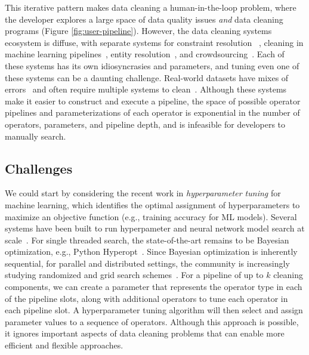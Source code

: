 This iterative pattern makes data cleaning a human-in-the-loop problem, where the developer explores a large space of data quality issues {\it and} data cleaning programs (Figure \ref{fig:user-pipeline}).  However, the data cleaning systems ecosystem is diffuse, with separate systems for constraint resolution ~\cite{rekatsinas2017holoclean}, cleaning in machine learning pipelines~\cite{DBLP:journals/pvldb/KrishnanWWFG16}, entity resolution~\cite{mudgal2018deep, doan2018toward}, and crowdsourcing~\cite{DBLP:journals/pvldb/HaasKWF015}.
Each of these systems has its own idiosyncrasies and parameters, and tuning even one of these systems can be a daunting challenge.
Real-world datasets have mixes of errors~\cite{krishnan2016hilda} and often require multiple systems to clean~\cite{DBLP:conf/sigmod/ChuIKW16}.
Although these systems make it easier to construct and execute a pipeline, the space of possible operator pipelines and parameterizations of each operator is exponential in the number of operators, parameters, and pipeline depth, and is infeasible for developers to manually search.

\subsection{Challenges}
We could start by considering the recent work in \emph{hyperparameter tuning} for machine learning, which identifies the optimal assignment of hyperparameters to maximize an objective function (e.g., training accuracy for ML models).
Several systems have been built to run hyperpameter and neural network model search at scale~\cite{li2017hyperband, sparks2017keystoneml, baylor2017tfx, golovin2017google, liaw2018tune}.
For single threaded search, the state-of-the-art remains to be Bayesian optimization, e.g., Python Hyperopt~\cite{bergstra2013hyperopt}.
Since Bayesian optimization is inherently sequential, for parallel and distributed settings, the community is increasingly studying randomized and grid search schemes~\cite{li2017hyperband, liaw2018tune, golovin2017google}.
For a pipeline of up to $k$ cleaning components, we can create a parameter that represents the operator type in each of the pipeline slots, along with additional operators to tune each operator in each pipeline slot.  A hyperparameter tuning algorithm will then select and assign parameter values to a sequence of operators.
Although this approach is possible, it ignores important aspects of data cleaning problems that can enable more efficient and flexible approaches.  

